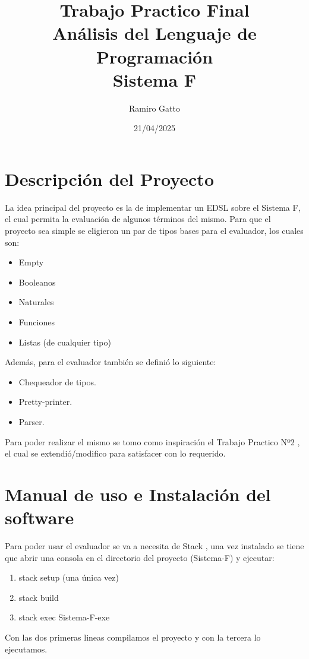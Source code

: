 \documentclass[12pt, titlepage, a4paper]{article}
\title{Trabajo Practico Final \\ 
Análisis del Lenguaje de Programación \\
Sistema F}
\author{Ramiro Gatto}
\date{21/04/2025}
\begin{document}
\maketitle

\section{Descripción del Proyecto}
La idea principal del proyecto es la de implementar un EDSL sobre el Sistema F, el cual permita la evaluación de algunos términos del mismo. Para  
que el proyecto sea simple se eligieron un par de tipos bases para el evaluador, los cuales son: 
\begin{itemize}[label=$\bullet$]
    \item {Empty}
    \item {Booleanos}
    \item {Naturales}
    \item {Funciones}
    \item {Listas (de cualquier tipo)}
\end{itemize}

\noindent Además, para el evaluador también se definió lo siguiente:
\begin{itemize}[label=$\bullet$]
    \item {Chequeador de tipos.}
    \item {Pretty-printer.}
    \item {Parser.}
\end{itemize}

Para poder realizar el mismo se tomo como inspiración el Trabajo Practico Nº2 \cite{tp2:lambdaCalculoSimpleTipado}, el cual se 
extendió/modifico para satisfacer con lo requerido.


\section{Manual de uso e Instalación del software}
Para poder usar el evaluador se va a necesita de Stack \cite{haskellStack}, una vez instalado se tiene que abrir una consola en el 
directorio del proyecto (Sistema-F) y ejecutar:
\begin{enumerate}
    \item stack setup (una única vez)
    \item stack build
    \item stack exec Sistema-F-exe
\end{enumerate}

\noindent Con las dos primeras lineas compilamos el proyecto y con la tercera lo ejecutamos.
\end{document}
